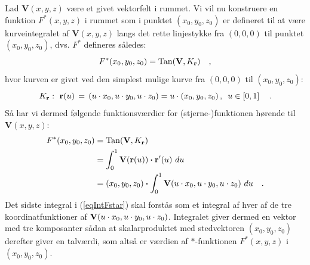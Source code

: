 \begin{method}\label{metodeTangKurveVar}
Lad $\mathbf{V}(x,y,z)$ være et givet vektorfelt i rummet. Vi vil nu konstruere en funktion $F^{*}(x,y,z)$ i rummet
som i punktet $(x_{0}, y_{0}, z_{0})$ er defineret til at være kurveintegralet af $\mathbf{V}(x,y,z)$ langs det rette linjestykke fra $(0,0,0)$ til punktet $(x_{0}, y_{0}, z_{0})$, dvs. $F^{*}$ defineres således:
\begin{equation}
F^{*}(x_{0}, y_{0}, z_{0}) = \operatorname{Tan}({\bf V}, K_{\bf r}) \quad ,
\end{equation}
hvor kurven er givet ved den simplest mulige kurve fra $(0,0,0)$ til $(x_{0}, y_{0}, z_{0})$:
\begin{equation}
K_{\bf r}: \,\, {\bf r}(u) \, = \,(u\cdot x_{0}, u\cdot y_{0},  u\cdot z_{0}) = u \cdot (x_{0}, y_{0}, z_{0}) \, , \, \, \, u \in
\left[ 0, 1\right]\quad .
\end{equation}
Så har vi dermed følgende funktionsværdier for (stjerne-)funktionen hørende til $\mathbf{V}(x,y,z)$:
\begin{equation} \label{eqIntFstar}
\begin{aligned}
F^{*}(x_{0}, y_{0}, z_{0}) &= \operatorname{Tan}({\bf V}, K_{\bf r}) \\
&=  \int_{0}^{1}{\bf V}({\bf r}(u))\bm{\cdot} {\bf r}'(u)\,\,du  \\
&=  (x_{0}, y_{0}, z_{0}) \bm{\cdot} \int_{0}^{1}{\bf V}(u\cdot x_{0}, u\cdot y_{0}, u\cdot z_{0}) \,\,du  \quad .
\end{aligned}
\end{equation}
Det sidste integral i (\ref{eqIntFstar}) skal forstås som et integral af hver af de tre koordinatfunktioner af ${\bf V}(u\cdot x_{0}, u\cdot y_{0}, u\cdot z_{0})$. Integralet giver dermed en vektor med tre komposanter sådan at skalarproduktet med stedvektoren $(x_{0}, y_{0}, z_{0})$ derefter giver en talværdi, som altså er værdien af $*$-funktionen $F^{*}(x,y,z)$ i $(x_{0}, y_{0}, z_{0})$.
\end{method}

